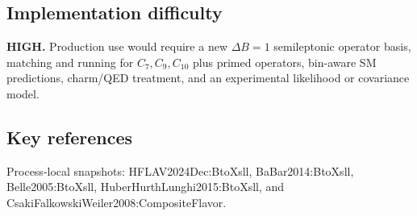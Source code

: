 \subsection*{Implementation difficulty}
\textbf{HIGH.}  Production use would require a new \(\Delta B=1\) semileptonic
operator basis, matching and running for \(C_7,C_9,C_{10}\) plus primed
operators, bin-aware SM predictions, charm/QED treatment, and an experimental
likelihood or covariance model.

\subsection*{Key references}
Process-local snapshots: HFLAV2024Dec:BtoXsll, BaBar2014:BtoXsll,
Belle2005:BtoXsll, HuberHurthLunghi2015:BtoXsll, and
CsakiFalkowskiWeiler2008:CompositeFlavor.

